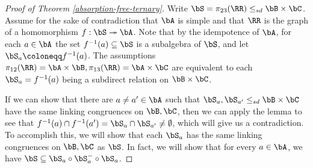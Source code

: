\begin{proof}[Proof of Theorem \ref{absorption-free-ternary}] Write $\bS = \pi_{23}(\RR) \le_{sd} \bB \times \bC$. Assume for the sake of contradiction that $\bA$ is simple and that $\RR$ is the graph of a homomorphism $f : \bS \twoheadrightarrow \bA$. Note that by the idempotence of $\bA$, for each $a \in \bA$ the set $f^{-1}(a) \subseteq \bS$ is a subalgebra of $\bS$, and let $\bS_a \coloneqq f^{-1}(a)$. The assumptions $\pi_{12}(\RR) = \bA \times \bB, \pi_{13}(\RR) = \bA \times \bC$ are equivalent to each $\bS_a = f^{-1}(a)$ being a subdirect relation on $\bB \times \bC$.

If we can show that there are $a \ne a' \in \bA$ such that $\bS_a, \bS_{a'} \le_{sd} \bB \times \bC$ have the same linking congruences on $\bB, \bC$, then we can apply the lemma to see that $f^{-1}(a) \cap f^{-1}(a') = \bS_a \cap \bS_{a'} \ne \emptyset$, which will give us a contradiction. To accomplish this, we will show that each $\bS_a$ has the same linking congruences on $\bB, \bC$ as $\bS$. In fact, we will show that for every $a \in \bA$, we have $\bS \subseteq \bS_a\circ \bS_a^{-} \circ \bS_a$.


\end{proof}
